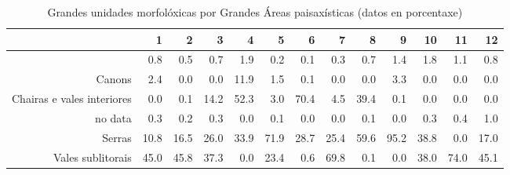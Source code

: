 \begin{table}[p]
\centering
\caption{Grandes unidades morfolóxicas por Grandes Áreas paisaxísticas (datos en porcentaxe)} 
\label{xtaboa1p}
\begin{tabular}{rrrrrrrrrrrrr}
  \hline
 & 1 & 2 & 3 & 4 & 5 & 6 & 7 & 8 & 9 & 10 & 11 & 12 \\ 
  \hline
 & 0.8 & 0.5 & 0.7 & 1.9 & 0.2 & 0.1 & 0.3 & 0.7 & 1.4 & 1.8 & 1.1 & 0.8 \\ 
  Canons & 2.4 & 0.0 & 0.0 & 11.9 & 1.5 & 0.1 & 0.0 & 0.0 & 3.3 & 0.0 & 0.0 & 0.0 \\ 
  Chairas e vales interiores & 0.0 & 0.1 & 14.2 & 52.3 & 3.0 & 70.4 & 4.5 & 39.4 & 0.1 & 0.0 & 0.0 & 0.0 \\ 
  no data & 0.3 & 0.2 & 0.3 & 0.0 & 0.1 & 0.0 & 0.0 & 0.1 & 0.0 & 0.3 & 0.4 & 1.0 \\ 
  Serras & 10.8 & 16.5 & 26.0 & 33.9 & 71.9 & 28.7 & 25.4 & 59.6 & 95.2 & 38.8 & 0.0 & 17.0 \\ 
  Vales sublitorais & 45.0 & 45.8 & 37.3 & 0.0 & 23.4 & 0.6 & 69.8 & 0.1 & 0.0 & 38.0 & 74.0 & 45.1 \\ 
   \hline
\end{tabular}
\end{table}
